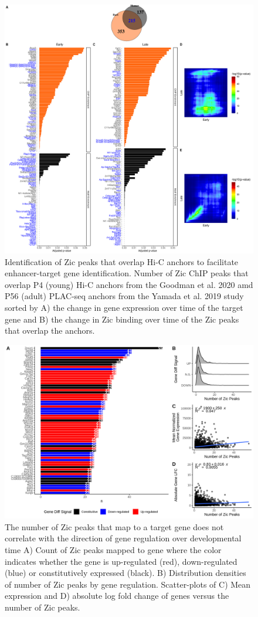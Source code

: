 \documentclass[fleqn,10pt]{wlscirep}
\begin{document}
\begin{figure}[ht]
\centering
\includegraphics[width=.90\linewidth]{../figures/supp_figure2.png}
\caption{ Identification of Zic peaks that overlap Hi-C anchors to facilitate enhancer-target gene identification. Number of Zic ChIP peaks that overlap P4 (young) Hi-C anchors from the Goodman et al. 2020 \cite{Goodman2020TheBrain} amd P56 (adult) PLAC-seq anchors from the Yamada et al. 2019 study \cite{Yamada2019SensoryLearning} sorted by A) the change in gene expression over time of the target gene and B) the change in Zic binding over time of the Zic peaks that overlap the anchors.}
\label{fig:MappingStats}
\end{figure}


\begin{figure}[ht]
\centering
\includegraphics[width=.90\linewidth]{../figures/supp_figure3.png}
\caption{ The number of Zic peaks that map to a target gene does not correlate with the direction of gene regulation over developmental time A) Count of Zic peaks mapped to gene where the color indicates whether the gene is up-regulated (red), down-regulated (blue) or constitutively expressed (black). B) Distribution densities of number of Zic peaks by gene regulation.  Scatter-plots of C) Mean expression and D) absolute log fold change of genes versus the number of Zic peaks. }
\label{fig:npeakstoGenes}
\end{figure}
\end{document}
